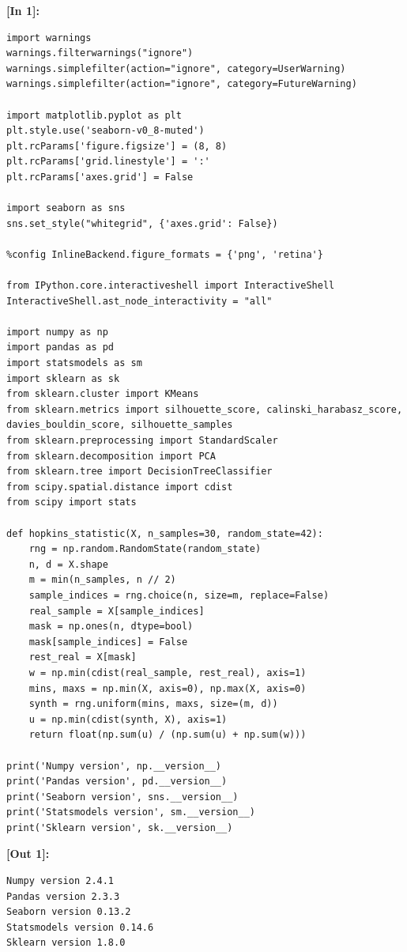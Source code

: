 \vspace{0.4em}
\noindent\textbf{\small [In 1]:}
\begin{lstlisting}[style=pycode]
import warnings
warnings.filterwarnings("ignore")
warnings.simplefilter(action="ignore", category=UserWarning)
warnings.simplefilter(action="ignore", category=FutureWarning)

import matplotlib.pyplot as plt
plt.style.use('seaborn-v0_8-muted')
plt.rcParams['figure.figsize'] = (8, 8)
plt.rcParams['grid.linestyle'] = ':'
plt.rcParams['axes.grid'] = False

import seaborn as sns
sns.set_style("whitegrid", {'axes.grid': False})

%config InlineBackend.figure_formats = {'png', 'retina'}

from IPython.core.interactiveshell import InteractiveShell
InteractiveShell.ast_node_interactivity = "all"

import numpy as np
import pandas as pd
import statsmodels as sm
import sklearn as sk
from sklearn.cluster import KMeans
from sklearn.metrics import silhouette_score, calinski_harabasz_score, davies_bouldin_score, silhouette_samples
from sklearn.preprocessing import StandardScaler
from sklearn.decomposition import PCA
from sklearn.tree import DecisionTreeClassifier
from scipy.spatial.distance import cdist
from scipy import stats

def hopkins_statistic(X, n_samples=30, random_state=42):
    rng = np.random.RandomState(random_state)
    n, d = X.shape
    m = min(n_samples, n // 2)
    sample_indices = rng.choice(n, size=m, replace=False)
    real_sample = X[sample_indices]
    mask = np.ones(n, dtype=bool)
    mask[sample_indices] = False
    rest_real = X[mask]
    w = np.min(cdist(real_sample, rest_real), axis=1)
    mins, maxs = np.min(X, axis=0), np.max(X, axis=0)
    synth = rng.uniform(mins, maxs, size=(m, d))
    u = np.min(cdist(synth, X), axis=1)
    return float(np.sum(u) / (np.sum(u) + np.sum(w)))

print('Numpy version', np.__version__)
print('Pandas version', pd.__version__)
print('Seaborn version', sns.__version__)
print('Statsmodels version', sm.__version__)
print('Sklearn version', sk.__version__)
\end{lstlisting}
\noindent\textbf{\small [Out 1]:}
\begin{lstlisting}[style=output]
Numpy version 2.4.1
Pandas version 2.3.3
Seaborn version 0.13.2
Statsmodels version 0.14.6
Sklearn version 1.8.0
\end{lstlisting}

